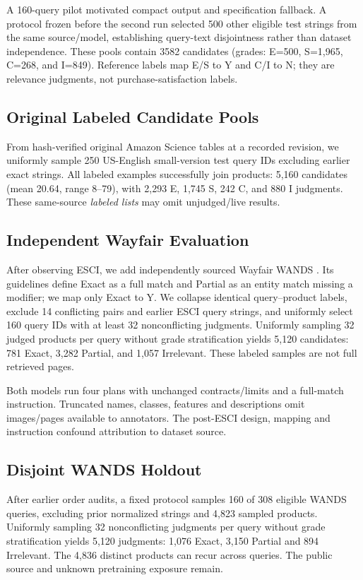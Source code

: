 \documentclass[conference]{IEEEtran}
\begin{document}
A 160-query pilot motivated compact output and specification fallback. A protocol frozen before the second run selected 500 other eligible test strings from the same source/model, establishing query-text disjointness rather than dataset independence. These pools contain 3582 candidates (grades: E=500, S=1,965, C=268, and I=849). Reference labels map E/S to Y and C/I to N; they are relevance judgments, not purchase-satisfaction labels.

\subsection{Original Labeled Candidate Pools}
From hash-verified original Amazon Science tables at a recorded revision, we uniformly sample 250 US-English small-version test query IDs excluding earlier exact strings. All labeled examples successfully join products: 5,160 candidates (mean 20.64, range 8--79), with 2,293 E, 1,745 S, 242 C, and 880 I judgments. These same-source \emph{labeled lists} may omit unjudged/live results.

\subsection{Independent Wayfair Evaluation}
After observing ESCI, we add independently sourced Wayfair WANDS \cite{wands}. Its guidelines define Exact as a full match and Partial as an entity match missing a modifier; we map only Exact to Y. We collapse identical query--product labels, exclude 14 conflicting pairs and earlier ESCI query strings, and uniformly select 160 query IDs with at least 32 nonconflicting judgments. Uniformly sampling 32 judged products per query without grade stratification yields 5,120 candidates: 781 Exact, 3,282 Partial, and 1,057 Irrelevant. These labeled samples are not full retrieved pages.

Both models run four plans with unchanged contracts/limits and a full-match instruction. Truncated names, classes, features and descriptions omit images/pages available to annotators. The post-ESCI design, mapping and instruction confound attribution to dataset source.

\subsection{Disjoint WANDS Holdout}
After earlier order audits, a fixed protocol samples 160 of 308 eligible WANDS queries, excluding prior normalized strings and 4,823 sampled products. Uniformly sampling 32 nonconflicting judgments per query without grade stratification yields 5,120 judgments: 1,076 Exact, 3,150 Partial and 894 Irrelevant. The 4,836 distinct products can recur across queries. The public source and unknown pretraining exposure remain.
\end{document}
